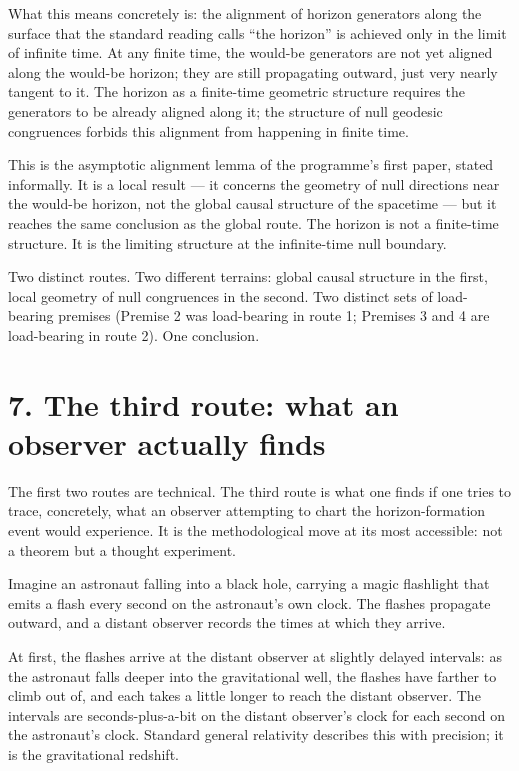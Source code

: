 \documentclass[11pt,a4paper]{article}
\begin{document}
What this means concretely is: the alignment of horizon generators along the surface that the standard reading calls ``the horizon'' is achieved only in the limit of infinite time. At any finite time, the would-be generators are not yet aligned along the would-be horizon; they are still propagating outward, just very nearly tangent to it. The horizon as a finite-time geometric structure requires the generators to be already aligned along it; the structure of null geodesic congruences forbids this alignment from happening in finite time.

This is the asymptotic alignment lemma of the programme's first paper, stated informally. It is a local result --- it concerns the geometry of null directions near the would-be horizon, not the global causal structure of the spacetime --- but it reaches the same conclusion as the global route. The horizon is not a finite-time structure. It is the limiting structure at the infinite-time null boundary.

Two distinct routes. Two different terrains: global causal structure in the first, local geometry of null congruences in the second. Two distinct sets of load-bearing premises (Premise 2 was load-bearing in route 1; Premises 3 and 4 are load-bearing in route 2). One conclusion.

\section*{7. The third route: what an observer actually finds}

The first two routes are technical. The third route is what one finds if one tries to trace, concretely, what an observer attempting to chart the horizon-formation event would experience. It is the methodological move at its most accessible: not a theorem but a thought experiment.

Imagine an astronaut falling into a black hole, carrying a magic flashlight that emits a flash every second on the astronaut's own clock. The flashes propagate outward, and a distant observer records the times at which they arrive.

At first, the flashes arrive at the distant observer at slightly delayed intervals: as the astronaut falls deeper into the gravitational well, the flashes have farther to climb out of, and each takes a little longer to reach the distant observer. The intervals are seconds-plus-a-bit on the distant observer's clock for each second on the astronaut's clock. Standard general relativity describes this with precision; it is the gravitational redshift.
\end{document}
